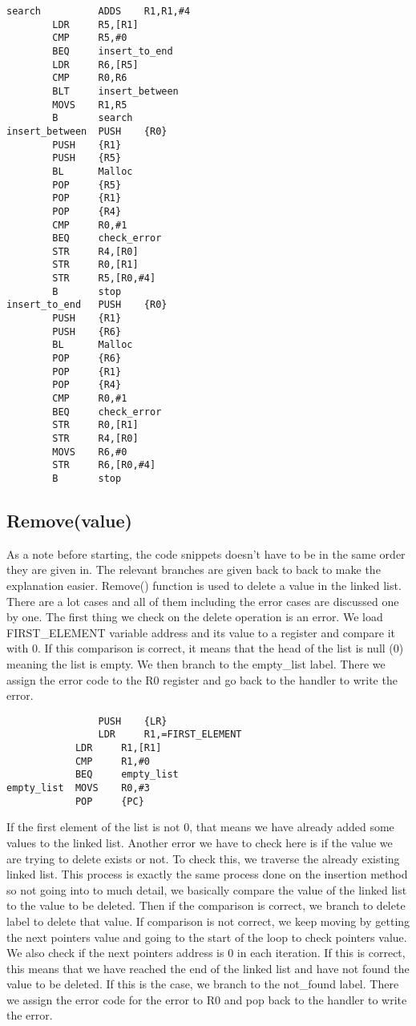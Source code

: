 \documentclass[pdftex,12pt,a4paper]{article}
\begin{document}
\begin{lstlisting}
search 	        ADDS    R1,R1,#4				
		LDR     R5,[R1]					
		CMP     R5,#0					
		BEQ     insert_to_end			
		LDR 	R6,[R5]					
		CMP     R0,R6						
		BLT     insert_between			
		MOVS    R1,R5					
		B       search					
insert_between	PUSH    {R0}						
		PUSH    {R1}					
		PUSH    {R5}					
		BL      Malloc					
		POP     {R5}						
		POP     {R1}						
		POP     {R4}					
		CMP     R0,#1					
		BEQ     check_error 				
		STR     R4,[R0]					
		STR     R0,[R1]					
		STR     R5,[R0,#4]					
		B       stop						
insert_to_end	PUSH    {R0}					
		PUSH    {R1}					
		PUSH    {R6}						
		BL      Malloc						
		POP     {R6}						
		POP     {R1}					
		POP     {R4}					
		CMP     R0,#1					
		BEQ     check_error				
		STR     R0,[R1]					
		STR     R4,[R0]					
		MOVS    R6,#0					
		STR     R6,[R0,#4]				
		B       stop
\end{lstlisting}



\subsection{Remove(value)}
As a note before starting, the code snippets doesn't have to be in the same order they are given in. The relevant branches are given back to back to make the explanation easier.
Remove() function is used to delete a value in the linked list. There are a lot cases and all of them including the error cases are discussed one by one. The first thing we check on the delete operation is an error. We load FIRST\_ELEMENT variable address and its value to a register and compare it with 0. If this comparison is correct, it means that the head of the list is null (0) meaning the list is empty. We then branch to the empty\_list label. There we assign the error code to the R0 register and go back to the handler to write the error.
\begin{lstlisting}
                PUSH    {LR}						
                LDR     R1,=FIRST_ELEMENT			
        	LDR     R1,[R1]					
        	CMP     R1,#0					
        	BEQ     empty_list					
empty_list	MOVS    R0,#3					
        	POP     {PC}
\end{lstlisting}

If the first element of the list is not 0, that means we have already added some values to the linked list. Another error we have to check here is if the value we are trying to delete exists or not. To check this, we traverse the already existing linked list. This process is exactly the same process done on the insertion method so not going into to much detail, we basically compare the value of the linked list to the value to be deleted. Then if the comparison is correct, we branch to delete label to delete that value. If comparison is not correct, we keep moving by getting the next pointers value and going to the start of the loop to check pointers value. We also check if the next pointers address is 0 in each iteration. If this is correct, this means that we have reached the end of the linked list and have not found the value to be deleted. If this is the case, we branch to the not\_found label. There we assign the error code for the error to R0 and pop back to the handler to write the error.
\end{document}

